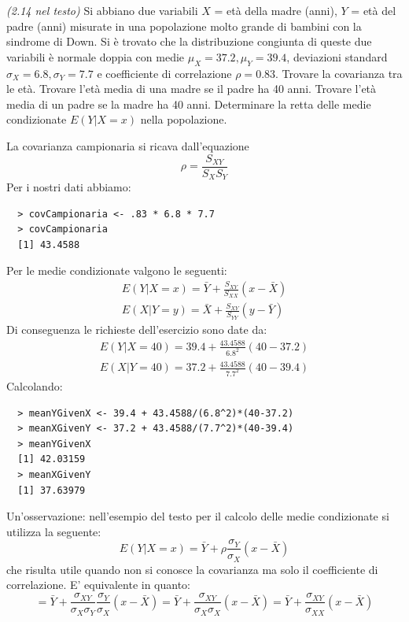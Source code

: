 \begin{exercise}{\emph{(2.14 nel testo)}}
  Si abbiano due variabili $X$ = et\`a della madre (anni), $Y$ = et\`a
  del padre (anni) misurate in una popolazione molto grande di bambini
  con la sindrome di Down. Si \`e trovato che la distribuzione
  congiunta di queste due variabili \`e normale doppia con medie
  $\mu_X = 37.2, \mu_Y = 39.4$, deviazioni standard $\sigma_X = 6.8,
  \sigma_Y = 7.7$ e coefficiente di correlazione $\rho = 0.83$.
  Trovare la covarianza tra le et\`a. Trovare l'et\`a media di una
  madre se il padre ha 40 anni. Trovare l'et\`a media di un padre se
  la madre ha 40 anni. Determinare la retta delle medie condizionate
  $E(Y |X = x)$ nella popolazione.
\end{exercise}
La covarianza campionaria si ricava dall'equazione
\begin{displaymath}
  \rho = \frac{S_{XY}}{S_X S_Y}
\end{displaymath}
Per i nostri dati abbiamo:
\begin{lstlisting}
  > covCampionaria <- .83 * 6.8 * 7.7
  > covCampionaria
  [1] 43.4588
\end{lstlisting}
Per le medie condizionate valgono le seguenti:
\begin{displaymath}
  \begin{split}
    E(Y|X=x)=\bar{Y} + \frac{S_{XY}}{S_{XX}}(x - \bar{X})\\
    E(X|Y=y)=\bar{X} + \frac{S_{XY}}{S_{YY}}(y - \bar{Y})
  \end{split}
\end{displaymath}
Di conseguenza le richieste dell'esercizio sono date da:
\begin{displaymath}
  \begin{split}
    E(Y|X=40)=39.4 + \frac{43.4588}{6.8^2}(40 - 37.2)\\
    E(X|Y=40)=37.2 + \frac{43.4588}{7.7^2}(40 - 39.4)
  \end{split}
\end{displaymath}
Calcolando:
\begin{lstlisting}
  > meanYGivenX <- 39.4 + 43.4588/(6.8^2)*(40-37.2)
  > meanXGivenY <- 37.2 + 43.4588/(7.7^2)*(40-39.4)
  > meanYGivenX
  [1] 42.03159
  > meanXGivenY
  [1] 37.63979
\end{lstlisting}
Un'osservazione: nell'esempio del testo per il calcolo delle medie
condizionate si utilizza la seguente:
\begin{displaymath}
  E(Y|X=x)=\bar{Y} + \rho \frac{\sigma_Y}{\sigma_X}(x - \bar{X})
\end{displaymath}
che risulta utile quando non si conosce la covarianza ma solo il
coefficiente di correlazione. E' equivalente in quanto:
\begin{displaymath}
  = \bar{Y} + \frac{\sigma_{XY}}{\sigma_X \sigma_Y}
  \frac{\sigma_Y}{\sigma_X}(x - \bar{X})=
  \bar{Y} +  \frac{\sigma_{XY}}{\sigma_X\sigma_X}(x - \bar{X})=
  \bar{Y} +  \frac{\sigma_{XY}}{\sigma_{XX}}(x - \bar{X})
\end{displaymath}

